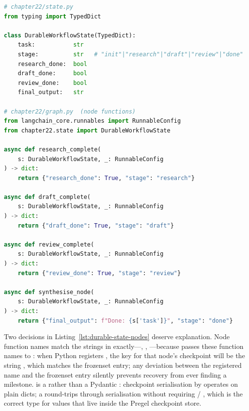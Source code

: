 \begin{lstlisting}[language=Python,
  caption={DurableWorkflowState and milestone node functions writing
           stage and boolean flags},
  label={lst:durable-state-nodes}]
# chapter22/state.py
from typing import TypedDict

class DurableWorkflowState(TypedDict):
    task:           str
    stage:          str   # "init"|"research"|"draft"|"review"|"done"
    research_done:  bool
    draft_done:     bool
    review_done:    bool
    final_output:   str

# chapter22/graph.py  (node functions)
from langchain_core.runnables import RunnableConfig
from chapter22.state import DurableWorkflowState

async def research_complete(
    s: DurableWorkflowState, _: RunnableConfig
) -> dict:
    return {"research_done": True, "stage": "research"}

async def draft_complete(
    s: DurableWorkflowState, _: RunnableConfig
) -> dict:
    return {"draft_done": True, "stage": "draft"}

async def review_complete(
    s: DurableWorkflowState, _: RunnableConfig
) -> dict:
    return {"review_done": True, "stage": "review"}

async def synthesise_node(
    s: DurableWorkflowState, _: RunnableConfig
) -> dict:
    return {"final_output": f"Done: {s['task']}", "stage": "done"}
\end{lstlisting}

Two decisions in Listing~\ref{lst:durable-state-nodes} deserve
explanation.
Node function names match the strings in 
exactly---, ,
---because  passes
these function names to : when Python registers
, the
 key for that node's checkpoint will be the
string , which matches the frozenset entry;
any deviation between the registered name and the frozenset entry
silently prevents recovery from ever finding a milestone.
 is a  rather than a Pydantic
: checkpoint serialisation by 
operates on plain dicts; a  round-trips through
serialisation without requiring  / ,
which is the correct type for values that live inside the Pregel
checkpoint store.

